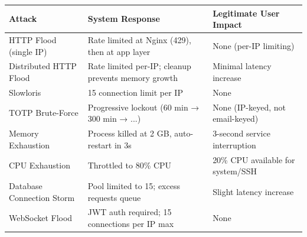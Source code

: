 \documentclass[11pt,a4paper]{article}
\begin{document}
\begin{center}
\small
\begin{tabularx}{\textwidth}{lXX}
\toprule
\textbf{Attack} & \textbf{System Response} & \textbf{Legitimate User Impact} \\
\midrule
HTTP Flood (single IP) & Rate limited at Nginx (429), then at app layer & None (per-IP limiting) \\
Distributed HTTP Flood & Rate limited per-IP; cleanup prevents memory growth & Minimal latency increase \\
Slowloris & 15 connection limit per IP & None \\
TOTP Brute-Force & Progressive lockout (60 min → 300 min → ...) & None (IP-keyed, not email-keyed) \\
Memory Exhaustion & Process killed at 2 GB, auto-restart in 3s & 3-second service interruption \\
CPU Exhaustion & Throttled to 80\% CPU & 20\% CPU available for system/SSH \\
Database Connection Storm & Pool limited to 15; excess requests queue & Slight latency increase \\
WebSocket Flood & JWT auth required; 15 connections per IP max & None \\
\bottomrule
\end{tabularx}
\end{center}
\end{document}
